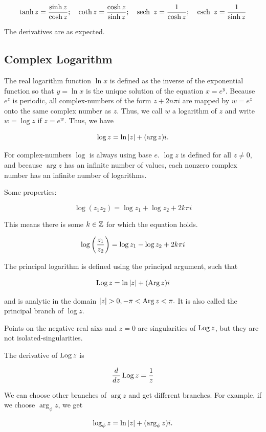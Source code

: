 \documentclass{article}
\begin{document}
\[ \tanh{z} = \frac{\sinh{z}}{\cosh{z}}; \quad \coth{z} = \frac{\cosh{z}}{\sinh{z}}; \quad \operatorname{sech}{~z} = \frac{1}{\cosh{z}}; \quad \operatorname{csch}{~z} = \frac{1}{\sinh{z}} \]

The derivatives are as expected.

\subsection{Complex Logarithm}

The real logarithm function $\ln{x}$ is defined as the inverse of the exponential function so that $y = \ln{x}$ is the unique solution of the equation $x = e^y$. Because $e^z$ is periodic, all \@{complex-numbers} of the form $z + 2n\pi i$ are mapped by $w = e^z$ onto the same complex number as $z$. Thus, we call $w$ a logarithm of $z$ and write $w = \log{z}$ if $z = e^w$. Thus, we have

\[ \log{z} = \ln{\left| z \right|} + (\arg{z})i. \]

For \@{complex-numbers} $\log$ is always using base $e$. $\log{z}$ is defined for all $z \neq 0$, and because $\arg{z}$ has an infinite number of values, each nonzero complex number has an infinite number of logarithms.

Some properties:

\[ \log{(z_1 z_2)} = \log{z_1} + \log{z_2} + 2 k \pi i \]

This means there is some $k \in \mathbb{Z}$ for which the equation holds.

\[ \log{\left(\frac{z_1}{z_2}\right)} =  \log{z_1} - \log{z_2} + 2 k \pi i \]

The principal logarithm is defined using the principal argument, such that

\[ \operatorname{Log}{z} = \ln{\left| z \right|} + (\operatorname{Arg}{z})i \]

and is \@{analytic} in the \@{domain} $\left| z \right| > 0, -\pi < \operatorname{Arg}{z} < \pi.$ It is also called the principal branch of $\log{z}$.

Points on the negative real aixs and $z = 0$ are \@{singularities} of $\operatorname{Log}{z}$, but they are not \@{isolated-singularities}.

The derivative of $\operatorname{Log}{z}$ is

\[ \frac{d}{dz} \operatorname{Log}{z} = \frac{1}{z} \]

We can choose other branches of $\arg{z}$ and get different branches. For example, if we choose $\arg_\phi{z}$, we get

\[ \log_\phi{z} = \ln{\left| z \right|} + (\arg_\phi{z})i. \]
\end{document}
